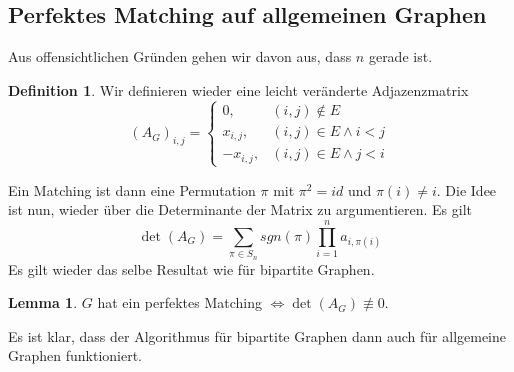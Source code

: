 \documentclass[a4paper, 12pt]{article}
\theoremstyle{plain}
\theoremstyle{definition}
\newtheorem{definition}[theorem]{Definition} %
\theoremstyle{lemma}
\newtheorem{lemma}[theorem]{Lemma}
\theoremstyle{remark}
\theoremstyle{corollary}
\theoremstyle{example}
\begin{document}
	\subsection{Perfektes Matching auf allgemeinen Graphen}
	Aus offensichtlichen Gründen gehen wir davon aus, dass $n$ gerade ist.
	\begin{definition}
		Wir definieren wieder eine leicht veränderte Adjazenzmatrix
		\[(A_G)_{i,j} = \begin{cases}
			0, & (i,j) \notin E\\
			x_{i,j}, & (i,j) \in E \land i<j\\
			-x_{i,j}, & (i,j) \in E \land j<i
		\end{cases}\]
	\end{definition}
	Ein Matching ist dann eine Permutation $\pi$ mit $\pi^2 = id$ und $\pi(i) \neq i$. Die Idee ist nun, wieder über die Determinante der Matrix zu argumentieren. Es gilt \[\det(A_G) = \sum_{\pi \in S_n} sgn(\pi) \prod_{i=1}^{n} a_{i,\pi(i)}\] Es gilt wieder das selbe Resultat wie für bipartite Graphen. \begin{lemma}
		$G$ hat ein perfektes Matching $\Leftrightarrow \det(A_G) \not\equiv 0$.
	\end{lemma}
	Es ist klar, dass der Algorithmus für bipartite Graphen dann auch für allgemeine Graphen funktioniert.
\end{document}
